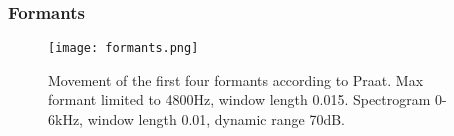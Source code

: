 \subsubsection{Formants} \label{x:formants}

%
\begin{figure}[H] 
	\centering
	\texttt{[image: formants.png]}
	\caption{Movement of the first four formants according to Praat. Max formant limited to 4800Hz, window length 0.015. Spectrogram 0-6kHz, window length 0.01, dynamic range 70dB.}
	\label{fig:formants}
\end{figure}
%
\renewcommand{\arraystretch}{0.9}
\begin{center}
\end{center}
\renewcommand{\arraystretch}{1.3}
